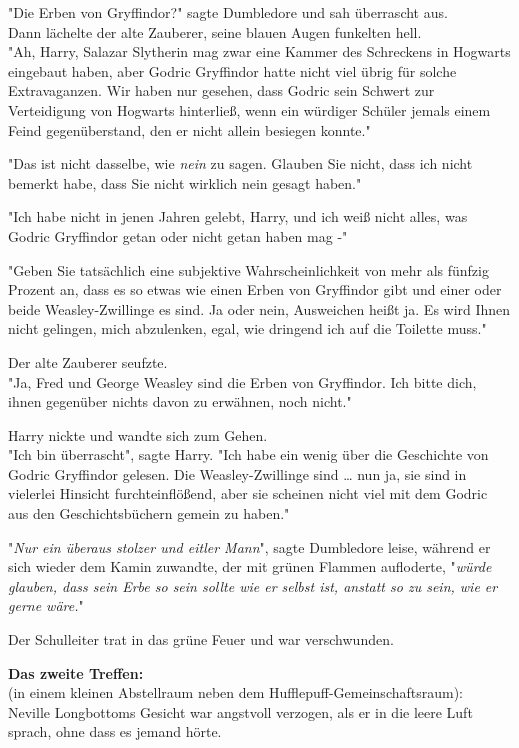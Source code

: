 {"Die Erben von Gryffindor?" sagte Dumbledore und sah überrascht aus.\\ Dann lächelte der alte Zauberer, seine blauen Augen funkelten hell.\\ "Ah, Harry, Salazar Slytherin mag zwar eine Kammer des Schreckens in Hogwarts eingebaut haben, aber Godric Gryffindor hatte nicht viel übrig für solche Extravaganzen. Wir haben nur gesehen, dass Godric sein Schwert zur Verteidigung von Hogwarts hinterließ, wenn ein würdiger Schüler jemals einem Feind gegenüberstand, den er nicht allein besiegen konnte."

"Das ist nicht dasselbe, wie \emph{nein} zu sagen. Glauben Sie nicht, dass ich nicht bemerkt habe, dass Sie nicht wirklich nein gesagt haben."

"Ich habe nicht in jenen Jahren gelebt, Harry, und ich weiß nicht alles, was Godric Gryffindor getan oder nicht getan haben mag -"

"Geben Sie tatsächlich eine subjektive Wahrscheinlichkeit von mehr als fünfzig Prozent an, dass es so etwas wie einen Erben von Gryffindor gibt und einer oder beide Weasley-Zwillinge es sind. Ja oder nein, Ausweichen heißt ja. Es wird Ihnen nicht gelingen, mich abzulenken, egal, wie dringend ich auf die Toilette muss."

Der alte Zauberer seufzte.\\ "Ja, Fred und George Weasley sind die Erben von Gryffindor. Ich bitte dich, ihnen gegenüber nichts davon zu erwähnen, noch nicht."

Harry nickte und wandte sich zum Gehen.\\ "Ich bin überrascht", sagte Harry. "Ich habe ein wenig über die Geschichte von Godric Gryffindor gelesen. Die Weasley-Zwillinge sind … nun ja, sie sind in vielerlei Hinsicht furchteinflößend, aber sie scheinen nicht viel mit dem Godric aus den Geschichtsbüchern gemein zu haben."

"\emph{Nur ein überaus stolzer und eitler Mann}", sagte Dumbledore leise, während er sich wieder dem Kamin zuwandte, der mit grünen Flammen aufloderte, "\emph{würde glauben, dass sein Erbe so sein sollte wie er selbst ist, anstatt so zu sein, wie er gerne wäre.}"

Der Schulleiter trat in das grüne Feuer und war verschwunden.

\textbf{Das zweite Treffen:}\\ (in einem kleinen Abstellraum neben dem Hufflepuff-Gemeinschaftsraum):\\ Neville Longbottoms Gesicht war angstvoll verzogen, als er in die leere Luft sprach, ohne dass es jemand hörte.

}
